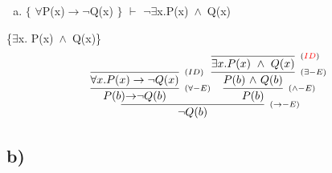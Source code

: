 \documentclass[aspectratio=43]{beamer}
\newcommand{\ria}{$\rightarrow$}
\newcommand{\fall}{$\forall$}
\newcommand{\ex}{$\exists$}
\newcommand{\nao}{$\neg$}
\newcommand{\nex}{\nao\ex}
\newcommand{\andd}{$\wedge$}
\begin{document}
    \begin{frame}[fragile]
    	
    	\begin{enumerate}[b)]
			
			\item $\{$ \fall P(x)\ria \nao Q(x) $\}$ $\vdash$ \nex  x.P(x)\ \andd\ Q(x) \\ 
			
		\end{enumerate}
        \{\ex  x. P(x)\ \andd\ Q(x)\}
        \vspace{90pt}
        \[
        \begin{array}{c}
		
        	\infer[_{(\to-E)}]
            {$\nao$ Q(b)}
            {\infer[_{(\forall-E)}] 
            	{P(b) $\ria$ $\nao$ Q(b)}
               	{\infer[_{(ID)}]
                	{\forall x.P(x)\to \neg Q(x)}
                    {}
                }  
            \infer[_{(\land-E)}] 
                {P(b)} 
                {\infer[_{(\exists-E)}] 
                        	{P(b)\ $\andd$\ Q(b)}
                        	{\infer[_{(\textcolor{red}{ID})}]
                            	{\exists x.P(x)\ \wedge\ Q(x)}
                            	{}
                            }
                }
            }
		\end{array}
        \]
        
	\end{frame}
    
    \subsection{b)}
        
\end{document}
